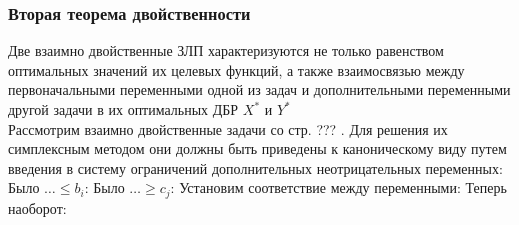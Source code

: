 \subsubsection{Вторая теорема двойственности}
Две взаимно двойственные ЗЛП характеризуются не только равенством оптимальных значений их целевых функций, а также взаимосвязью между первоначальными переменными одной из задач и дополнительными переменными другой задачи в их оптимальных ДБР $X^*$ и $Y^*$\\
Рассмотрим взаимно двойственные задачи со стр. ??? . Для решения их симплексным методом они должны быть приведены к каноническому виду путем введения в систему ограничений дополнительных неотрицательных переменных:\\
Было $\dots \leq b_i$:
Было $\dots \geq c_j$:
Установим соответствие между переменными:
\cent{
\dots\\
}
\cent{
\dots\\
}
Теперь наоборот:
\cent{
\dots\\
}
\cent{
\dots\\
}
